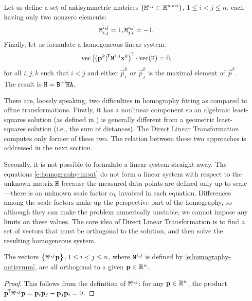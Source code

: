 Let us define a set of antisymmetric matrices $\{\mathtt{M}^{i, j} \in \mathbb{R}^{n \times n}\}$, $1 \leq i < j \leq n$, each having only two nonzero elements:
\begin{equation} \label{e:homography-antisymm}
\mathtt{M}^{i, j}_{i, j} = 1,
\mathtt{M}^{i, j}_{j, i} = -1.
\end{equation}
Finally, let us formulate a homogeneous linear system:
\begin{equation} \label{e:homography-system}
\mathrm{vec} \left(({\mathbf{p}}^k)^{\!\mathsf{T}} \mathtt{M}^{i, j} {\mathbf{x}}^k \right)^{\!\mathsf{T}} \cdot \mathrm{vec}(\mathtt{H}) = 0,
\end{equation}
for all $i, j, k$ such that $i < j$ and either $\vec p^k_i$ or $\vec p^k_j$ is the maximal element of $\vec p^k$.
The result is $\mathtt{H} = \mathtt{B} ^{-\mathsf{I}} \mathtt{H} \mathtt{A}$.

There are, loosely speaking, two difficulties in homography fitting as compared to affine transformations.
Firstly, it has a nonlinear component so an algebraic least-squares solution (as defined in \cite[p.93]{hartley03}) is generally different from a geometric least-squares solution (i.e., the sum of distances).
The Direct Linear Transformation computes only former of these two.
The relation between these two approaches is addressed in the next section.

Secondly, it is not possible to formulate a linear system straight away.
The equations \eqref{e:homography-input} do not form a linear system with respect to the unknown matrix $\mathtt{H}$ because the measured data points are defined only up to scale---there is an unknown scale factor $\alpha_k$ involved in each equation.
Differences among the scale factors make up the perspective part of the homography, so although they can make the problem numerically unstable, we cannot impose any limits on these values.
The core idea of Direct Linear Transformation is to find a set of vectors that must be orthogonal to the solution, and then solve the resulting homogeneous system.

\begin{lemma} \label{l:homography-orthogonal}
The vectors $\left\{ \mathtt{M}^{i, j} \mathbf{p} \right\}, 1 \leq i < j \leq n$, where $\mathtt{M}^{i,j}$ is defined by \eqref{e:homography-antisymm}, are all orthogonal to a given $\mathbf{p} \in \mathbb{R}^n$.
\end{lemma}
\begin{proof}
This follows from the definition of $\mathtt{M}^{i,j}$: for any $\mathbf{p} \in \mathbb{R}^n$, the product $\mathbf{p}^{\!\mathsf{T}} \mathtt{M}^{i, j} \mathbf{p} = \mathbf{p}_{i} \mathbf{p}_{j} - \mathbf{p}_{j} \mathbf{p}_{i} = 0$.
\end{proof}

